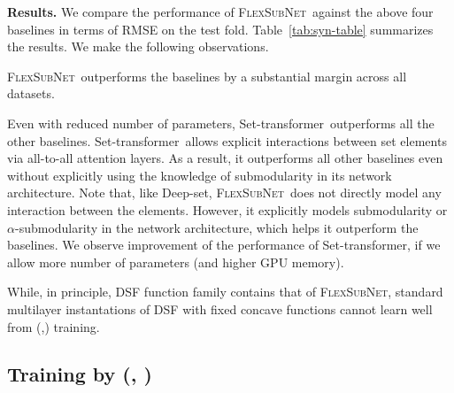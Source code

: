 \documentclass{article}
\newcommand{\our}{\textsc{Flex\-Sub\-Net}}
\newcommand{\xhdr}[1]{\noindent\textbf{#1.}}
\newcommand{\deepset}{Deep-set}
\newcommand{\settx}{Set-transformer}
\begin{document}
\xhdr{Results}
We compare the performance of \our\ against the above four baselines
in terms of RMSE on the test fold. 
Table~\ref{tab:syn-table} summarizes the results.
We make the following observations. 
\begin{enumerate*}[(1)]
\item \our\ outperforms the baselines by a substantial margin across all datasets.
\item Even with reduced number of parameters, \settx\ outperforms all the other baselines. 
\settx\ allows explicit interactions between set elements via all-to-all attention layers. As a result, it outperforms all other baselines even without explicitly using the knowledge of submodularity in its network architecture.
Note that, like \deepset, \our\ does not directly model any interaction between the elements.
However, it explicitly models  submodularity or $\alpha$-submodularity in the network architecture, which helps it outperform the baselines. We observe improvement of the performance of \settx, if we allow more number of parameters (and higher GPU memory). 
%
%
\item While, in principle, DSF function family contains that of \our, standard multilayer instantations of DSF with fixed concave functions cannot learn well from (\tset,\tvalue) training.
\end{enumerate*}

 
\subsection{Training by (\tuniv, \thigh)}
\label{sec:real-main}
\end{document}

